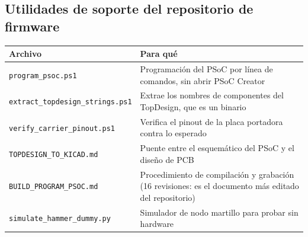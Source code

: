 \subsection{Utilidades de soporte del repositorio de firmware}

\begin{center}\footnotesize
\begin{tabularx}{\textwidth}{@{}l X@{}}
\toprule
Archivo & Para qu\'e \\
\midrule
\texttt{program\_psoc.ps1} & Programaci\'on del PSoC por l\'inea de comandos, sin abrir PSoC Creator \\
\texttt{extract\_topdesign\_strings.ps1} & Extrae los nombres de componentes del TopDesign, que es un binario \\
\texttt{verify\_carrier\_pinout.ps1} & Verifica el pinout de la placa portadora contra lo esperado \\
\texttt{TOPDESIGN\_TO\_KICAD.md} & Puente entre el esquem\'atico del PSoC y el dise\~no de PCB \\
\texttt{BUILD\_PROGRAM\_PSOC.md} & Procedimiento de compilaci\'on y grabaci\'on (16 revisiones: es el documento m\'as editado del repositorio) \\
\texttt{simulate\_hammer\_dummy.py} & Simulador de nodo martillo para probar sin hardware \\
\bottomrule
\end{tabularx}
\end{center}

